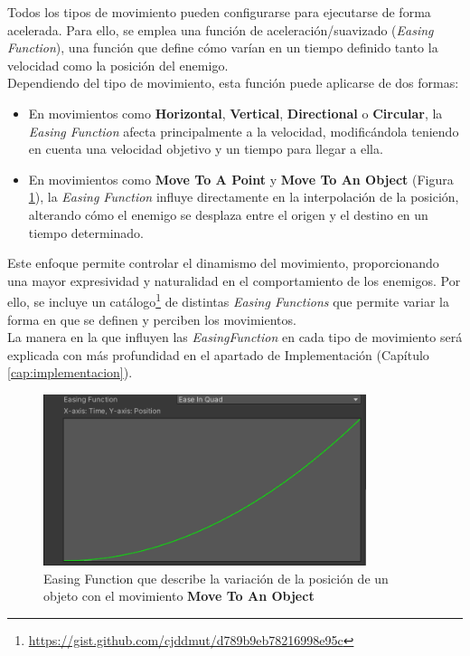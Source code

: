 Todos los tipos de movimiento pueden configurarse para ejecutarse de forma acelerada. Para ello, se emplea una función de aceleración/suavizado (\textit{Easing Function}), una función que define cómo varían en un tiempo definido tanto la velocidad como la posición del enemigo. \\
Dependiendo del tipo de movimiento, esta función puede aplicarse de dos formas:\\

\begin{itemize}
\item En movimientos como \textbf{Horizontal}, \textbf{Vertical}, \textbf{Directional} o \textbf{Circular}, la \textit{Easing Function} afecta principalmente a la velocidad, modificándola teniendo en cuenta una velocidad objetivo y un tiempo para llegar a ella.
\item En movimientos como \textbf{Move To A Point} y \textbf{Move To An Object} (Figura \ref{fig:EasingFunction}), la \textit{Easing Function} influye directamente en la interpolación de la posición, alterando cómo el enemigo se desplaza entre el origen y el destino en un tiempo determinado.
\end{itemize}

Este enfoque permite controlar el dinamismo del movimiento, proporcionando una mayor expresividad y naturalidad en el comportamiento de los enemigos. Por ello, se incluye un catálogo\footnote{\url{https://gist.github.com/cjddmut/d789b9eb78216998e95c}} de distintas \textit{Easing Functions} que permite variar la forma en que se definen y perciben los movimientos.\\

La manera en la que influyen las \textit{EasingFunction} en cada tipo de movimiento será explicada con más profundidad en el apartado de Implementación (Capítulo \ref{cap:implementacion}).

\begin{figure}[t]
	\centering
	\includegraphics[height=5cm]{Imagenes/EasingFunction.png}
	\caption{Easing Function que describe la variación de la posición de un objeto con el movimiento \textbf{Move To An Object}}
	\label{fig:EasingFunction}
\end{figure}

